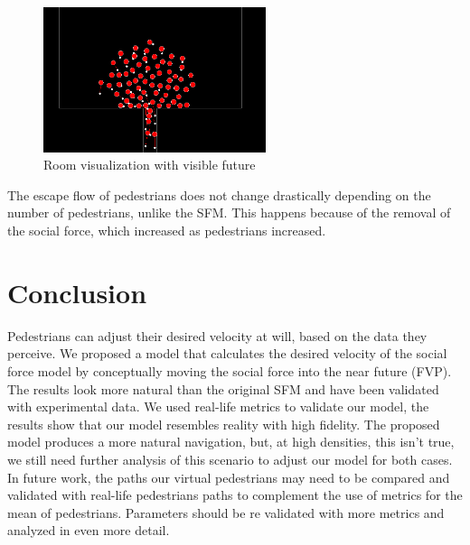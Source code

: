 \documentclass[english]{article}
\begin{document}
    \begin{figure}[H]
        \centering{} \includegraphics[width=6.5cm]{pics/program/room-future}
        \caption{\label{fig:room-future} Room visualization with visible future}
    \end{figure}
    
    The escape flow of pedestrians does not change drastically depending on the
    number of pedestrians, unlike the SFM. This happens because of the removal
    of the social force, which increased as pedestrians increased.

\section{Conclusion}
    
    Pedestrians can adjust their desired velocity at will, based on the
    data they perceive. We proposed a model that calculates the desired
    velocity of the social force model by conceptually moving the social
    force into the near future (FVP). The results look more natural than
    the original SFM and have been validated with experimental data. We
    used real-life metrics to validate our model, the results show that
    our model resembles reality with high fidelity. The proposed model
    produces a more natural navigation, but, at high densities, this isn't
    true, we still need further analysis of this scenario to adjust our
    model for both cases. \\
    In future work, the paths our virtual pedestrians
    may need to be compared and validated with real-life pedestrians
    paths to complement the use of metrics for the mean of pedestrians.
    Parameters should be re validated with more metrics and analyzed in
    even more detail. \\
\newpage{}
\end{document}
